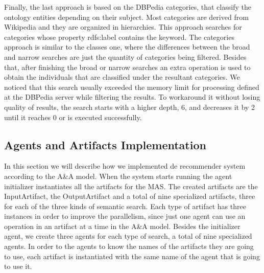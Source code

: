 \documentclass[a4paper,twoside]{article}
\begin{document}
Finally, the last approach is based on the DBPedia categories, that classify the ontology entities depending on their subject. Most categories are derived from Wikipedia and they are organized in hierarchies. This approach searches for categories whose property rdfs:label contains the keyword. The categories approach is similar to the classes one, where the differences between the broad and narrow searches are just the quantity of categories being filtered. Besides that, after finishing the broad or narrow searches an extra operation is used to obtain the individuals that are classified under the resultant categories. We noticed that this search usually exceeded the memory limit for processing defined at the DBPedia server while filtering the results. To workaround it without losing quality of results, the search starts with a higher depth, 6, and decreases it by 2 until it reaches 0 or is executed successfully.


\subsection{Agents and Artifacts Implementation}
\label{sec:aeaimpl}

\noindent In this section we will describe how we implemented de recommender system according to the A\&A model. When the system starts running the agent initializer instantiates all the artifacts for the MAS. The created artifacts are the InputArtifact, the OutputArtifact and a total of nine specialized artifacts, three for each of the three kinds of semantic search. Each type of artifact has three instances in order to improve the parallelism, since just one agent can use an operation in an artifact at a time in the A\&A model. Besides the initializer agent, we create three agents for each type of search, a total of nine specialized agents. In order to the agents to know the names of the artifacts they are going to use, each artifact is instantiated with the same name of the agent that is going to use it.
\end{document}
